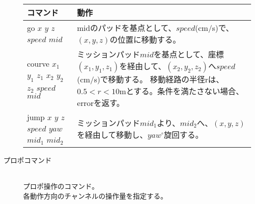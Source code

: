 \documentclass[a4paper, 12pt]{ltjsarticle}
\begin{document}
\begin{description}
        \begin{table}[h]
            \hspace{3\zw}
            \begin{tabular}{ll}
                \hline
                コマンド & 動作 \\ \hline \hline
                 go \(x\) \(y\) \(z\) \(speed\) \(mid\) &
                \begin{minipage}{0.45\textwidth}
                    \vspace{0.5\zh}
                    midのパッドを基点として、\(speed\)(cm/s)で、\((x,y,z)\)の位置に移動する。
                    \vspace{0.5\zh}
                \end{minipage} \\ \hline
                \begin{minipage}{0.25\textwidth}
                    courve \(x_1\) \(y_1\) \(z_1\) \(x_2\) \(y_2\) \(z_2\) \(speed\) \(mid\) 
                \end{minipage} &
                \begin{minipage}{0.45\textwidth}
                    \vspace{0.5\zh}
                    ミッションパッド\(mid\)を基点として、座標\((x_1,y_1,z_1)\)を経由して、\((x_2,y_2,z_2)\)へ\(speed\)(cm/s)で移動する。
                    移動経路の半径rは、\(0.5 < r < 10\)mとする。条件を満たさない場合、errorを返す。
                    \vspace{0.5\zh}
                \end{minipage} \\ \hline
                \begin{minipage}{0.25\textwidth}
                    jump \(x\) \(y\) \(z\) \(speed\) \(yaw\) \(mid_1\) \(mid_2\) 
                \end{minipage} &
                \begin{minipage}{0.45\textwidth}
                    \vspace{0.5\zh}
                    ミッションパッド\(mid_1\)より、\(mid_2\)へ、\((x,y,z)\)を経由して移動し、\(yaw^\circ\)旋回する。
                    \vspace{0.5\zh}
                \end{minipage} \\ \hline
            \end{tabular}
        \end{table}
    \item[プロポコマンド]\mbox{}\\
        プロポ操作のコマンド。\\
        各動作方向のチャンネルの操作量を指定する。


\end{description}
\end{document}
